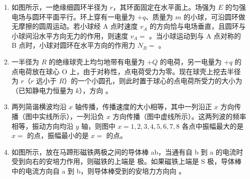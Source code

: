 \documentclass[\gkver]{gaokaozhenti}
\begin{document}
\begin{enumerate}
\item
如图所示，一绝缘细圆环半径为 $r$，其环面固定在水平面上。场强为 $E$ 的匀强电场与圆环平面平行。环上穿有一电量为 $+q$、质量为 $m$ 的小球，可沿圆环做无摩擦的圆周运动。若小球经 A 点时速度 $v_{A}$ 的方向恰与电场垂直，且圆环与小球间沿水平方向无力的作用，则速度 $v_{A} =$ 。当小球运动到与 A 点对称的 B 点时，小球对圆环在水平方向的作用力 $N_{B} =$ 。
\onepicture[align=right, w=3.36cm]{}

\item
一半径为 $R$ 的绝缘球壳上均匀地带有电量为 $+Q$ 的电荷，另一电量为 $+q$ 的点电荷放在球心 O 上，由于对称性，点电荷受力为零。现在球壳上挖去半径为 $r$（$r$ 远小于 $R$）的一个小圆孔，则此时置于球心的点电荷所受力的大小为 （已知静电力恒量为 $k$），方向 。

\item
两列简谐横波均沿 $x$ 轴传播，传播速度的大小相等，其中一列沿正 $x$ 方向传播（图中实线所示），一列沿负 $x$ 方向传播（图中虚线所示）。这两列波的频率相等，振动方向均沿 $y$ 轴，则图中 $x = 1, 2, 3, 4, 5, 6, 7, 8$ 各点中振幅最大的是 $x =$  的点，振幅最小的是 $x =$  的点。
\onepicture[align=right, w=11.89cm]{}

\item
如图所示，放在马蹄形磁铁两极之间的导体棒 ab，当通有自 b 到 a 的电流时受到向右的安培力作用，则磁铁的上端是  极。如果磁铁上端是 S 极，导体棒中的电流方向自 a 到 b，则导体棒受到的安培力方向向 。
\onepicture[align=right, w=3.80cm]{}


\end{enumerate}
\end{document}
